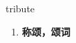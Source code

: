 
\begin{frame}
{\huge tribute}
\begin{center}
\begin{enumerate}\Large
  \item \textbf{称颂，颂词}
\end{enumerate}
\end{center}
\end{frame}
